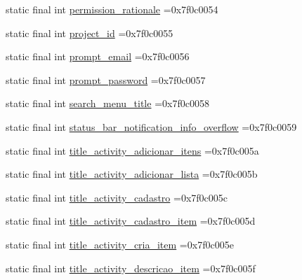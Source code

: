 \begin{DoxyCompactItemize}
\item 
static final int \mbox{\hyperlink{classbr_1_1unb_1_1cic_1_1mp_1_1marketmaster_1_1R_1_1string_a227e61f525053e9737021010dab36406}{permission\+\_\+rationale}} =0x7f0c0054
\item 
static final int \mbox{\hyperlink{classbr_1_1unb_1_1cic_1_1mp_1_1marketmaster_1_1R_1_1string_aad43805cde0ea0d1f3780e7022c22fb2}{project\+\_\+id}} =0x7f0c0055
\item 
static final int \mbox{\hyperlink{classbr_1_1unb_1_1cic_1_1mp_1_1marketmaster_1_1R_1_1string_a24f23586d0dabdbb8f7bdb934dbfc8ab}{prompt\+\_\+email}} =0x7f0c0056
\item 
static final int \mbox{\hyperlink{classbr_1_1unb_1_1cic_1_1mp_1_1marketmaster_1_1R_1_1string_adf85930df56d923a831492548596f758}{prompt\+\_\+password}} =0x7f0c0057
\item 
static final int \mbox{\hyperlink{classbr_1_1unb_1_1cic_1_1mp_1_1marketmaster_1_1R_1_1string_a753443b182555a67c06c9262d47752d9}{search\+\_\+menu\+\_\+title}} =0x7f0c0058
\item 
static final int \mbox{\hyperlink{classbr_1_1unb_1_1cic_1_1mp_1_1marketmaster_1_1R_1_1string_a6ef389555a1d2e9c14d7f53f5adf053e}{status\+\_\+bar\+\_\+notification\+\_\+info\+\_\+overflow}} =0x7f0c0059
\item 
static final int \mbox{\hyperlink{classbr_1_1unb_1_1cic_1_1mp_1_1marketmaster_1_1R_1_1string_a96332914c85364d37d80edc6dcbc2e00}{title\+\_\+activity\+\_\+adicionar\+\_\+itens}} =0x7f0c005a
\item 
static final int \mbox{\hyperlink{classbr_1_1unb_1_1cic_1_1mp_1_1marketmaster_1_1R_1_1string_a0fcf20c86fec269feae0680825ab129b}{title\+\_\+activity\+\_\+adicionar\+\_\+lista}} =0x7f0c005b
\item 
static final int \mbox{\hyperlink{classbr_1_1unb_1_1cic_1_1mp_1_1marketmaster_1_1R_1_1string_a6f0f0930a4fa037eef3908113494ec10}{title\+\_\+activity\+\_\+cadastro}} =0x7f0c005c
\item 
static final int \mbox{\hyperlink{classbr_1_1unb_1_1cic_1_1mp_1_1marketmaster_1_1R_1_1string_ae0f0d4a04e9bf1168e9a03ca70ff04ef}{title\+\_\+activity\+\_\+cadastro\+\_\+item}} =0x7f0c005d
\item 
static final int \mbox{\hyperlink{classbr_1_1unb_1_1cic_1_1mp_1_1marketmaster_1_1R_1_1string_ae7408f31f6bf3fabceb179ee401b0eb2}{title\+\_\+activity\+\_\+cria\+\_\+item}} =0x7f0c005e
\item 
static final int \mbox{\hyperlink{classbr_1_1unb_1_1cic_1_1mp_1_1marketmaster_1_1R_1_1string_a5928d6a65601a1681e246f6a3c4d0032}{title\+\_\+activity\+\_\+descricao\+\_\+item}} =0x7f0c005f

\end{DoxyCompactItemize}
